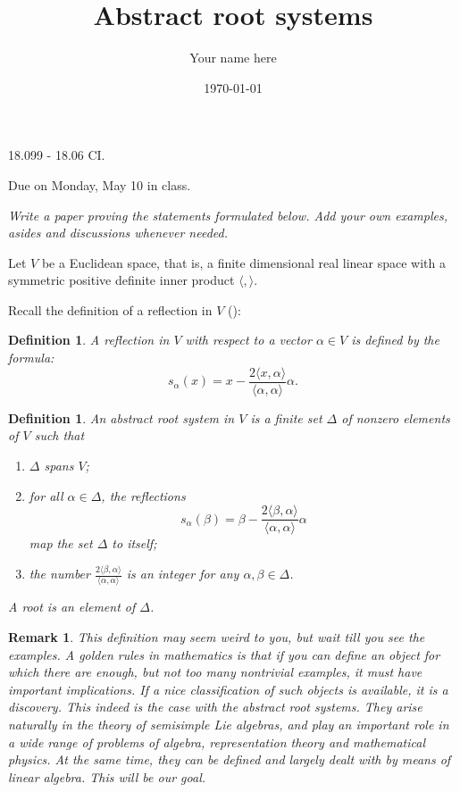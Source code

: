 \documentclass[11pt]{amsart}
\newcommand{\la}{\langle}
\newcommand{\ra}{\rangle}
\newtheorem{definition}[theorem]{Definition}
\newtheorem{remark}[theorem]{Remark}
\begin{document}
\title{Abstract root systems}
\author{Your name here}
\date{\today}
\maketitle


{\Large  18.099 - 18.06 CI.} 

{Due on Monday, May 10 in class.} 

\vspace{1cm} 

{\it Write a paper proving the statements formulated below. Add your own 
examples, asides and discussions whenever needed. }


Let $V$ be a Euclidean space, that is,
a finite dimensional real linear space with a symmetric 
positive definite inner product $\la, \ra$. 

Recall the definition of a reflection in $V$ (\cite{1}):

\begin{definition} A \emph{reflection} 
in $V$ with respect to a vector $\alpha \in V$ 
is defined by the formula: 
$$ s_\alpha (x) = 
x -\frac{2 \la x, \alpha \ra }{\la \alpha, \alpha \ra}\alpha. $$
\end{definition} 


\begin{definition} 
An \emph{abstract root system} in $V$ is a finite set $\Delta$ of nonzero 
elements of $V$ such that 
\begin{enumerate} 
\item{$\Delta$ spans $V$;}
\item{for all $\alpha \in \Delta$, the reflections  
$$ s_\alpha (\beta) = 
\beta -\frac{2 \la \beta, \alpha \ra }{\la \alpha, \alpha \ra}\alpha $$ 
map the set $\Delta$ to itself;}
\item{the number $\frac{2 \la \beta, \alpha \ra }{\la \alpha, \alpha \ra}$ 
is an integer for any $\alpha, \beta \in \Delta$.}
\end{enumerate} 
A \emph{root} is an element of $\Delta$. 
\end{definition} 

\begin{remark} This definition may seem weird to you, but wait till you 
see the examples. A golden rules in mathematics is that 
if you can define an object for which there are enough, but not too many 
nontrivial examples, it must have important implications. If a nice 
classification of such objects is available, it is a discovery. 
This indeed is the case with the abstract root systems. 
They  arise naturally in the theory of semisimple 
Lie algebras, and play an important role in a wide range of problems 
of algebra, representation theory and mathematical physics. 
At the same time, they can be defined and largely dealt 
with by means of linear algebra. This will be our goal.
\end{remark} 
\end{document}
